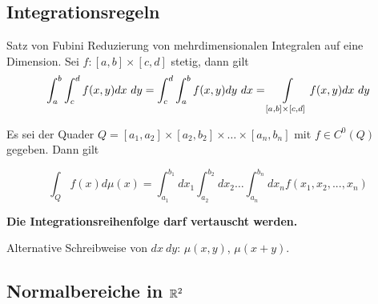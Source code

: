 \subsection{Integrationsregeln}

\begin{Satz}{Satz von Fubini}{}
    Reduzierung von mehrdimensionalen Integralen auf eine Dimension. Sei $f: [a,b] \times [c, d]$ stetig, dann gilt
    \[ \int_a^b \int_c^d f(x, y) dx ~ dy = \int_c^d \int_a^b f(x, y) dy ~ dx = \int\displaylimits_{[a,b] \times [c, d]} f(x, y) dx ~ dy   \]

    Es sei der Quader $Q = [a_1,a_2] \times [a_2, b_2] \times \dots \times [a_n, b_n]$ mit $f \in C^0(Q)$ gegeben. Dann gilt

    \[
        \int_Q f(x) d\mu(x) = \int_{a_1}^{b_1} dx_1 \int_{a_2}^{b_2} dx_2 \dots \int_{a_n}^{b_n} dx_n f(x_1, x_2,...,x_n)
    \]
    
    \textbf{Die Integrationsreihenfolge darf vertauscht werden.}
\end{Satz}

Alternative Schreibweise von $dx ~ dy$: $\mu(x, y)$, $\mu(x+y)$.

\subsection{Normalbereiche in $\mathbb{R}^2$}

